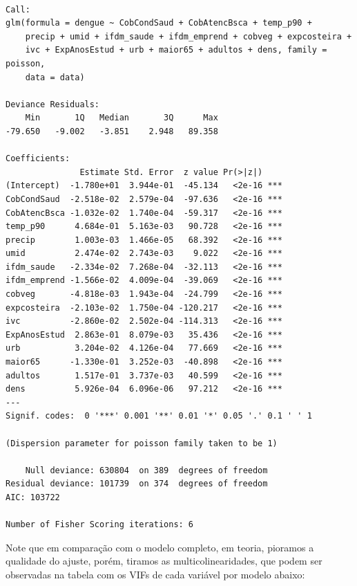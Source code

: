 \documentclass[12pt,a4paper]{article}\usepackage[]{graphicx}\usepackage[]{color}
\makeatletter
\newenvironment{kframe}{%
 \def\at@end@of@kframe{}%
 \ifinner\ifhmode%
  \def\at@end@of@kframe{\end{minipage}}%
  \begin{minipage}{\columnwidth}%
 \fi\fi%
 \def\FrameCommand##1{\hskip\@totalleftmargin \hskip-\fboxsep
 \colorbox{shadecolor}{##1}\hskip-\fboxsep
     \hskip-\linewidth \hskip-\@totalleftmargin \hskip\columnwidth}%
 \MakeFramed {\advance\hsize-\width
   \@totalleftmargin\z@ \linewidth\hsize
   \@setminipage}}%
 {\par\unskip\endMakeFramed%
 \at@end@of@kframe}
\newenvironment{knitrout}{}{} %
\makeatother
\begin{document}
\begin{knitrout}
\color{fgcolor}\begin{kframe}
\begin{verbatim}

Call:
glm(formula = dengue ~ CobCondSaud + CobAtencBsca + temp_p90 + 
    precip + umid + ifdm_saude + ifdm_emprend + cobveg + expcosteira + 
    ivc + ExpAnosEstud + urb + maior65 + adultos + dens, family = poisson, 
    data = data)

Deviance Residuals: 
    Min       1Q   Median       3Q      Max  
-79.650   -9.002   -3.851    2.948   89.358  

Coefficients:
               Estimate Std. Error  z value Pr(>|z|)    
(Intercept)  -1.780e+01  3.944e-01  -45.134   <2e-16 ***
CobCondSaud  -2.518e-02  2.579e-04  -97.636   <2e-16 ***
CobAtencBsca -1.032e-02  1.740e-04  -59.317   <2e-16 ***
temp_p90      4.684e-01  5.163e-03   90.728   <2e-16 ***
precip        1.003e-03  1.466e-05   68.392   <2e-16 ***
umid          2.474e-02  2.743e-03    9.022   <2e-16 ***
ifdm_saude   -2.334e-02  7.268e-04  -32.113   <2e-16 ***
ifdm_emprend -1.566e-02  4.009e-04  -39.069   <2e-16 ***
cobveg       -4.818e-03  1.943e-04  -24.799   <2e-16 ***
expcosteira  -2.103e-02  1.750e-04 -120.217   <2e-16 ***
ivc          -2.860e-02  2.502e-04 -114.313   <2e-16 ***
ExpAnosEstud  2.863e-01  8.079e-03   35.436   <2e-16 ***
urb           3.204e-02  4.126e-04   77.669   <2e-16 ***
maior65      -1.330e-01  3.252e-03  -40.898   <2e-16 ***
adultos       1.517e-01  3.737e-03   40.599   <2e-16 ***
dens          5.926e-04  6.096e-06   97.212   <2e-16 ***
---
Signif. codes:  0 '***' 0.001 '**' 0.01 '*' 0.05 '.' 0.1 ' ' 1

(Dispersion parameter for poisson family taken to be 1)

    Null deviance: 630804  on 389  degrees of freedom
Residual deviance: 101739  on 374  degrees of freedom
AIC: 103722

Number of Fisher Scoring iterations: 6
\end{verbatim}
\end{kframe}
\end{knitrout}


Note que em comparação com o modelo completo, em teoria, pioramos a qualidade do ajuste, porém, tiramos as multicolinearidades, que podem ser observadas na tabela com os VIFs de cada variável por modelo abaixo:
\end{document}
